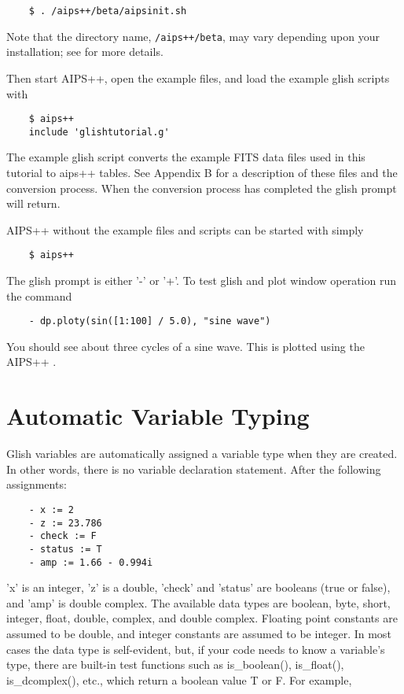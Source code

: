 \begin{verbatim}
	$ . /aips++/beta/aipsinit.sh
\end{verbatim}

Note that the directory name, \verb!/aips++/beta!, may vary depending upon your
installation; see  for more details.

Then start AIPS++, open the example files, and load the example glish
scripts with

\begin{verbatim}
	$ aips++
	include 'glishtutorial.g'
\end{verbatim}
The example glish script converts the example FITS data files used
in this tutorial to aips++ tables.  See Appendix B for a description of
these files and the conversion process.  When the conversion process
has completed the glish prompt will return.

AIPS++ without the example files and scripts can be started with simply

\begin{verbatim}
	$ aips++
\end{verbatim}

The glish prompt is either '-' or '+'.  To test glish and plot window
operation run the command

\begin{verbatim}
	- dp.ploty(sin([1:100] / 5.0), "sine wave")
\end{verbatim}

You should see about three cycles of a sine wave. This is plotted
using the AIPS++ .

\section{Automatic Variable Typing}

    Glish variables are automatically assigned a variable type when they
are created.  In other words, there is no variable declaration statement.
After the following assignments:

\begin{verbatim}
	- x := 2
	- z := 23.786
	- check := F
	- status := T
	- amp := 1.66 - 0.994i
\end{verbatim}

'x' is an integer, 'z' is a double, 'check' and 'status' are booleans (true
or false), and 'amp' is double complex.  The available data types are
boolean, byte, short, integer, float, double, complex, and double complex.
Floating point constants are assumed to be double, and integer constants
are assumed to be integer.  In most cases the data type is self-evident,
but, if your code needs to know a variable's type, there are built-in test
functions such as is\_boolean(), is\_float(), is\_dcomplex(), etc., which 
return a boolean value T or F.  For example,

